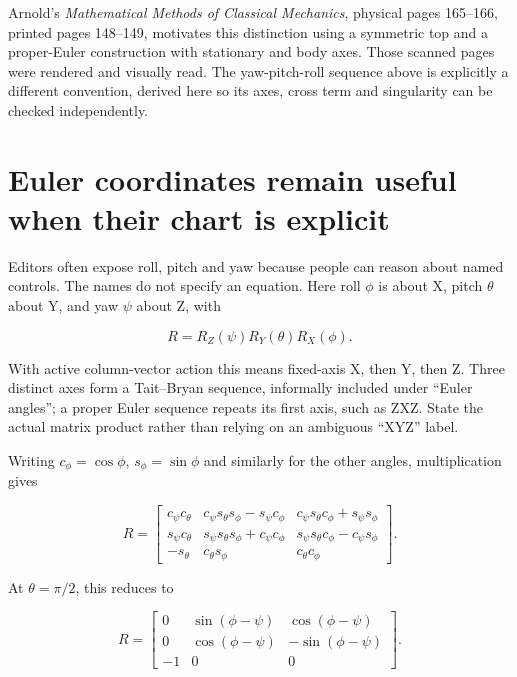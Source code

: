 Arnold's \emph{Mathematical Methods of Classical Mechanics}, physical pages 165--166, printed pages 148--149, motivates this distinction using a symmetric top and a proper-Euler construction with stationary and body axes. Those scanned pages were rendered and visually read. The yaw-pitch-roll sequence above is explicitly a different convention, derived here so its axes, cross term and singularity can be checked independently.

\section{Euler coordinates remain useful when their chart is explicit}\label{01-foundations-i-ch019-euler-coordinates-remain-useful-when-their-chart-is-explicit}

\hypertarget{01-foundations-i-ch019-euler-coordinates-remain-useful-when-their-chart-is-explicit}{}

Editors often expose roll, pitch and yaw because people can reason about named controls. The names do not specify an equation. Here roll \(\phi\) is about X, pitch \(\theta\) about Y, and yaw \(\psi\) about Z, with

\[
R=R_Z(\psi)R_Y(\theta)R_X(\phi).
\]

With active column-vector action this means fixed-axis X, then Y, then Z. Three distinct axes form a Tait--Bryan sequence, informally included under ``Euler angles''; a proper Euler sequence repeats its first axis, such as ZXZ. State the actual matrix product rather than relying on an ambiguous ``XYZ'' label.

Writing \(c_\phi=\cos\phi\), \(s_\phi=\sin\phi\) and similarly for the other angles, multiplication gives

\[
R=\begin{bmatrix}
c_\psi c_\theta&c_\psi s_\theta s_\phi-s_\psi c_\phi&c_\psi s_\theta c_\phi+s_\psi s_\phi\\
s_\psi c_\theta&s_\psi s_\theta s_\phi+c_\psi c_\phi&s_\psi s_\theta c_\phi-c_\psi s_\phi\\
-s_\theta&c_\theta s_\phi&c_\theta c_\phi
\end{bmatrix}.
\]

At \(\theta=\pi/2\), this reduces to

\[
R=\begin{bmatrix}
0&\sin(\phi-\psi)&\cos(\phi-\psi)\\
0&\cos(\phi-\psi)&-\sin(\phi-\psi)\\
-1&0&0
\end{bmatrix}.
\]

